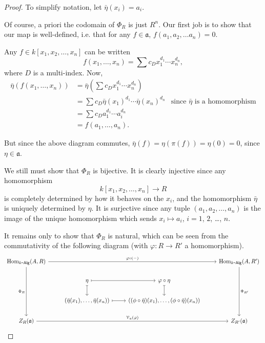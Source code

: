 \documentclass[a4paper,10pt]{scrreprt}
\newcommand{\Hom}{\mathrm{Hom}}
\def\mhyp{{\hbox{-}}}
\theoremstyle{definition}
\theoremstyle{plain}
\theoremstyle{remark}
\begin{document}
\begin{proof}
  To simplify notation, let $\bar{\eta}(x_{i}) = a_{i}$.

  Of course, a priori the codomain of $\Phi_{R}$ is just $R^{n}$. Our first job is to show that our map is well-defined, i.e. that for any $f \in \mathfrak{a}$, $f(a_{1}, a_{2}, \ldots a_{n}) = 0$.

  Any $f \in k[x_{1}, x_{2}, \ldots, x_{n}]$ can be written
  \begin{equation*}
    f(x_{1}, \ldots, x_{n}) = \sum c_{D} x_{1}^{d_{1}}\cdots x_{n}^{d_{n}},
  \end{equation*}
  where $D$ is a multi-index. Now,
  \begin{align*}
    \bar{\eta}(f(x_{1}, \ldots, x_{n})) &= \bar{\eta}\left( \sum c_{D} x_{1}^{d_{1}}\cdots x_{n}^{d_{n}} \right) \\
    &= \sum c_{D} \bar{\eta}(x_{1})^{d_{1}}\cdots \bar{\eta}(x_{n})^{d_{n}} &\text{since $\bar{\eta}$ is a homomorphism} \\
    &= \sum c_{D} a_{1}^{d_{1}}\cdots a_{i}^{d_{n}} \\
    &= f(a_{1}, \ldots, a_{n}).
  \end{align*}

  But since the above diagram commutes, $\bar{\eta}(f) = \eta(\pi(f)) = \eta(0) = 0$, since $\eta \in \mathfrak{a}$.

  We still must show that $\Phi_{R}$ is bijective. It is clearly injective since any homomorphism 
  \begin{equation*}
    k[x_{1}, x_{2}, \ldots, x_{n}] \to R
  \end{equation*}
  is completely determined by how it behaves on the $x_{i}$, and the homomorphism $\bar{\eta}$ is uniquely determined by $\eta$. It is surjective since any tuple $(a_{1}, a_{2}, \ldots, a_{n})$ is the image of the unique homomorphism which sends $x_{i} \mapsto a_{i}$, $i = 1$, $2$, \dots, $n$.

  It remains only to show that $\Phi_{R}$ is natural, which can be seen from the commutativity of the following diagram (with $\varphi\colon R \to R'$ a homomorphism).
  \begin{equation*}
    \begin{tikzcd}
      \Hom_{k\mhyp\mathsf{Alg}}(A, R)
      \arrow[rrr, "\varphi \circ (-)"]
      \arrow[ddd, swap, "\Phi_{R}"]
      & & & \Hom_{k\mhyp\mathsf{Alg}}(A, R')
      \arrow[ddd, "\Phi_{R'}"]
      \\
      & \eta
      \arrow[r, mapsto]
      \arrow[d, mapsto]
      & \varphi \circ \eta
      \arrow[d, mapsto]
      \\
      & (\bar{\eta}(x_1), \ldots, \bar{\eta}(x_{n}))
      \arrow[r, mapsto]
      & ((\phi \circ \bar{\eta})(x_1), \ldots, (\phi \circ \bar{\eta})(x_{n}))
      \\
      Z_{R}(\mathfrak{a})
      \arrow[rrr, "\mathcal{V}_{\mathfrak{a}}(\varphi)"]
      & & & Z_{R'}(\mathfrak{a})
    \end{tikzcd}
  \end{equation*}
\end{proof}
\end{document}
